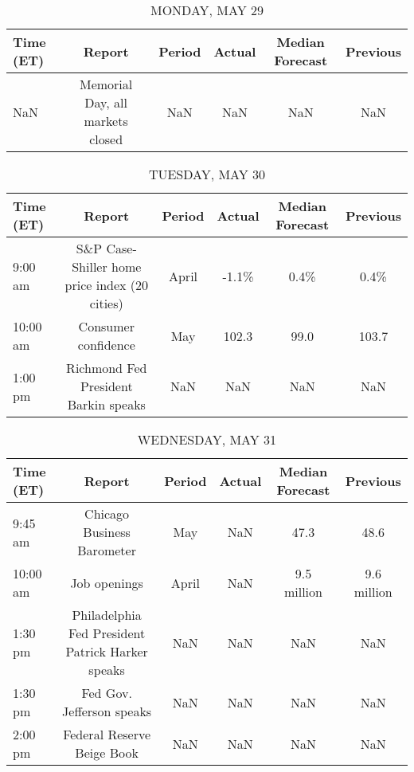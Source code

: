 \documentclass{article}%
\begin{document}
%
\normalsize%


\begin{table}[htbp]%
\caption{MONDAY, MAY 29}%
\centering%
\begin{adjustbox}{width=1\textwidth}%
\begin{tabular}{lccccc}
\toprule
Time (ET) &                           Report & Period & Actual & Median Forecast & Previous \\
\midrule
      NaN & Memorial Day, all markets closed &    NaN &    NaN &             NaN &      NaN \\
\bottomrule
\end{tabular}
%
\end{adjustbox}%
\end{table}

%


\begin{table}[htbp]%
\caption{TUESDAY, MAY 30}%
\centering%
\begin{adjustbox}{width=1\textwidth}%
\begin{tabular}{lccccc}
\toprule
Time (ET) &                                        Report & Period & Actual & Median Forecast & Previous \\
\midrule
  9:00 am & S\&P Case-Shiller home price index (20 cities) &  April &  -1.1\% &            0.4\% &     0.4\% \\
 10:00 am &                           Consumer confidence &    May &  102.3 &            99.0 &    103.7 \\
  1:00 pm &          Richmond Fed President Barkin speaks &    NaN &    NaN &             NaN &      NaN \\
\bottomrule
\end{tabular}
%
\end{adjustbox}%
\end{table}

%


\begin{table}[htbp]%
\caption{WEDNESDAY, MAY 31}%
\centering%
\begin{adjustbox}{width=1\textwidth}%
\begin{tabular}{lccccc}
\toprule
Time (ET) &                                           Report & Period & Actual & Median Forecast &    Previous \\
\midrule
  9:45 am &                       Chicago Business Barometer &    May &    NaN &            47.3 &        48.6 \\
 10:00 am &                                     Job openings &  April &    NaN &     9.5 million & 9.6 million \\
  1:30 pm & Philadelphia Fed President Patrick Harker speaks &    NaN &    NaN &             NaN &         NaN \\
  1:30 pm &                        Fed Gov. Jefferson speaks &    NaN &    NaN &             NaN &         NaN \\
  2:00 pm &                       Federal Reserve Beige Book &    NaN &    NaN &             NaN &         NaN \\
\bottomrule
\end{tabular}
%
\end{adjustbox}%
\end{table}
\end{document}
